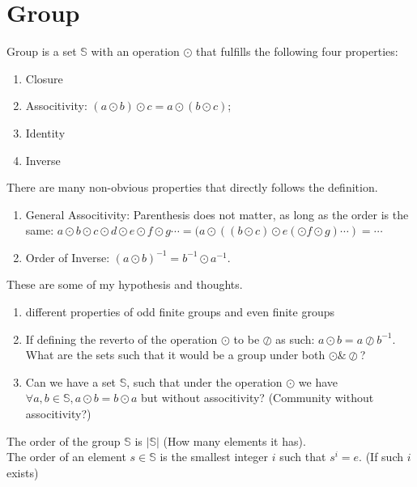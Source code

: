 \documentclass[../note.tex]{subfiles}
\begin{document}
\section{Group}

\begin{definition}[Group]
Group is a set $\mathbb{S}$ with an operation $\odot$ that fulfills the following four properties:
\begin{enumerate}
	\item Closure
	\item Associtivity: $(a \odot b) \odot c = a \odot (b \odot c)$;
	\item Identity
	\item Inverse
\end{enumerate}
\end{definition}
\begin{theorem}
There are many non-obvious properties that directly follows the definition.
\begin{enumerate}
	\item General Associtivity: Parenthesis does not matter, as long as the order is the same: 
		$a \odot b \odot c \odot d \odot e \odot f \odot g \cdots  = (a \odot ((b \odot c) \odot e (\odot f \odot g)\cdots) = \cdots$
	\item Order of Inverse: $(a \odot b)^{-1}=b^{-1}\odot a^{-1}$.  
\end{enumerate}
\end{theorem}

\begin{hypothesis}
	These are some of my hypothesis and thoughts.
	\begin{enumerate}
		\item different properties of odd finite groups and even finite groups
		\item If defining the reverto of the operation $\odot $ to be $\oslash $ as such: $a \odot b = a \oslash b^{-1}$. What are the sets such that it would be a group under both $\odot \& \oslash$?
		\item Can we have a set $\mathbb{S}$, such that under the operation $\odot $ we have $\forall a, b \in \mathbb{S}, a \odot b = b \odot  a$ but without associtivity? (Community without associtivity?)
	\end{enumerate}
\end{hypothesis}
\begin{definition}
The order of the group $\mathbb{S}$ is $|\mathbb{S}|$ (How many elements it has). \\
The order of an element $s \in \mathbb{S}$ is the smallest integer $i$ such that $s^i = e.$ (If such $i$ exists)
\end{definition}
\end{document}

